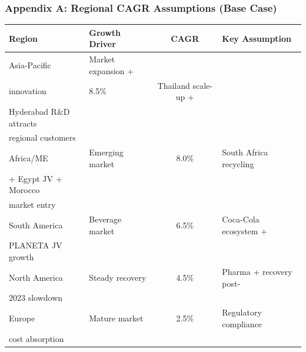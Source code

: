 \documentclass[aspectratio=169,12pt,xcolor=dvipsnames]{beamer}
\begin{document}
\begin{frame}
  \frametitle{Appendix A: Regional CAGR Assumptions (Base Case)}

  \small

  \begin{tabular}{|l|l|c|p{4cm}|}
    \hline
    \textbf{Region} & \textbf{Growth Driver} & \textbf{CAGR} & \textbf{Key Assumption} \\
    \hline

    Asia-Pacific & Market expansion + \\
    innovation & 8.5\% &
    Thailand scale-up + \\
    Hyderabad R\&D attracts \\
    regional customers \\
    \hline

    Africa/ME & Emerging market & 8.0\% &
    South Africa recycling \\
    + Egypt JV + Morocco \\
    market entry \\
    \hline

    South America & Beverage market & 6.5\% &
    Coca-Cola ecosystem + \\
    PLANETA JV growth \\
    \hline

    North America & Steady recovery & 4.5\% &
    Pharma + recovery post- \\
    2023 slowdown \\
    \hline

    Europe & Mature market & 2.5\% &
    Regulatory compliance \\
    cost absorption \\
    \hline
  \end{tabular}

\end{frame}
\end{document}
